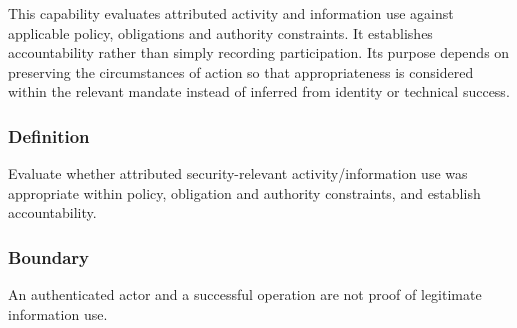 This capability evaluates attributed activity and information use against applicable policy, obligations and authority constraints. It establishes accountability rather than simply recording participation. Its purpose depends on preserving the circumstances of action so that appropriateness is considered within the relevant mandate instead of inferred from identity or technical success.

\subsubsection*{Definition}

Evaluate whether attributed security-relevant activity/\allowbreak{}information use was appropriate within policy, obligation and authority constraints, and establish accountability.

\subsubsection*{Boundary}

An authenticated actor and a successful operation are not proof of legitimate information use.

